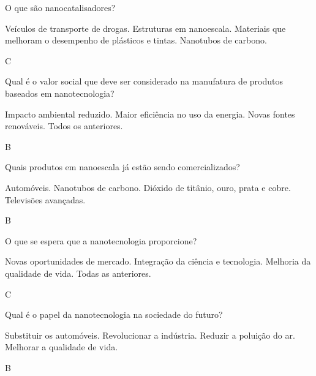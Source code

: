 \documentclass[10pt]{scrartcl}
\begin{document}
\begin{exercise}[points=1]
O que são nanocatalisadores?
\begin{choice}
\choice Veículos de transporte de drogas.
\choice Estruturas em nanoescala.
\choice Materiais que melhoram o desempenho de plásticos e tintas.
\choice Nanotubos de carbono.
\end{choice}
\end{exercise}
\begin{solution}
C
\end{solution}

\begin{exercise}[points=1]
Qual é o valor social que deve ser considerado na manufatura de produtos baseados em nanotecnologia?
\begin{choice}
\choice Impacto ambiental reduzido.
\choice Maior eficiência no uso da energia.
\choice Novas fontes renováveis.
\choice Todos os anteriores.
\end{choice}
\end{exercise}
\begin{solution}
B
\end{solution}



\begin{exercise}[points=1]
Quais produtos em nanoescala já estão sendo comercializados?
\begin{choice}
\choice Automóveis.
\choice Nanotubos de carbono.
\choice Dióxido de titânio, ouro, prata e cobre.
\choice Televisões avançadas.
\end{choice}
\end{exercise}
\begin{solution}
B
\end{solution}




\begin{exercise}[points=1]
O que se espera que a nanotecnologia proporcione?
\begin{choice}
\choice Novas oportunidades de mercado.
\choice Integração da ciência e tecnologia.
\choice Melhoria da qualidade de vida.
\choice Todas as anteriores.
\end{choice}
\end{exercise}
\begin{solution}
C
\end{solution}



\begin{exercise}[points=1]
Qual é o papel da nanotecnologia na sociedade do futuro?
\begin{choice}
\choice Substituir os automóveis.
\choice Revolucionar a indústria.
\choice Reduzir a poluição do ar.
\choice Melhorar a qualidade de vida.
\end{choice}
\end{exercise}
\begin{solution}
B
\end{solution}
\end{document}
